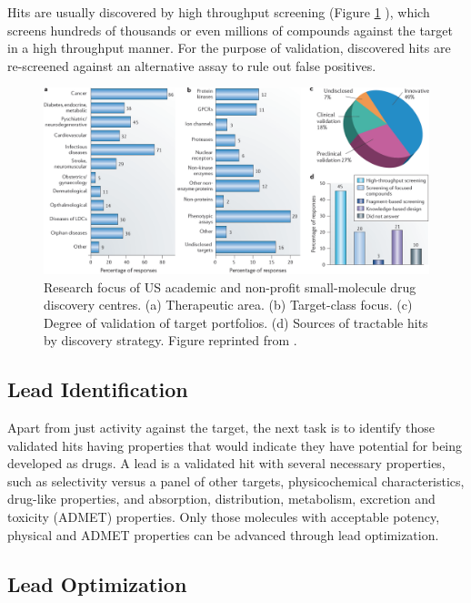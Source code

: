 Hits are usually discovered by high throughput screening \citep{795,504,736} (Figure \ref{fig:USAcademicDrugDiscoveryResearchFocus} \citep{721}), which screens hundreds of thousands or even millions of compounds against the target in a high throughput manner. For the purpose of validation, discovered hits are re-screened against an alternative assay to rule out false positives.

\begin{figure}
\centering
\includegraphics[width=\textwidth]{Figures/USAcademicDrugDiscoveryResearchFocus.png}
\caption{Research focus of US academic and non-profit small-molecule drug discovery centres. (a) Therapeutic area. (b) Target-class focus. (c) Degree of validation of target portfolios. (d) Sources of tractable hits by discovery strategy. Figure reprinted from \citep{721}.}
\label{fig:USAcademicDrugDiscoveryResearchFocus}
\end{figure}

\subsection{Lead Identification}

Apart from just activity against the target, the next task is to identify those validated hits having properties that would indicate they have potential for being developed as drugs. A lead is a validated hit with several necessary properties, such as selectivity versus a panel of other targets, physicochemical characteristics, drug-like properties, and absorption, distribution, metabolism, excretion and toxicity (ADMET) properties. Only those molecules with acceptable potency, physical and ADMET properties can be advanced through lead optimization.

\subsection{Lead Optimization}


